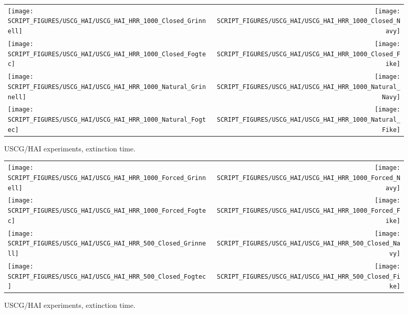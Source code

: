 


\newpage

\begin{figure}[p]
\begin{tabular*}{\textwidth}{l@{\extracolsep{\fill}}r}
\texttt{[image: SCRIPT\_FIGURES/USCG\_HAI/USCG\_HAI\_HRR\_1000\_Closed\_Grinnell]} &
\texttt{[image: SCRIPT\_FIGURES/USCG\_HAI/USCG\_HAI\_HRR\_1000\_Closed\_Navy]} \\
\texttt{[image: SCRIPT\_FIGURES/USCG\_HAI/USCG\_HAI\_HRR\_1000\_Closed\_Fogtec]} &
\texttt{[image: SCRIPT\_FIGURES/USCG\_HAI/USCG\_HAI\_HRR\_1000\_Closed\_Fike]} \\
\texttt{[image: SCRIPT\_FIGURES/USCG\_HAI/USCG\_HAI\_HRR\_1000\_Natural\_Grinnell]} &
\texttt{[image: SCRIPT\_FIGURES/USCG\_HAI/USCG\_HAI\_HRR\_1000\_Natural\_Navy]} \\
\texttt{[image: SCRIPT\_FIGURES/USCG\_HAI/USCG\_HAI\_HRR\_1000\_Natural\_Fogtec]} &
\texttt{[image: SCRIPT\_FIGURES/USCG\_HAI/USCG\_HAI\_HRR\_1000\_Natural\_Fike]}
\end{tabular*}
\caption[USCG/HAI experiments, extinction time]{USCG/HAI experiments, extinction time.}
\label{USCG_HAI_2}
\end{figure}

\begin{figure}[p]
\begin{tabular*}{\textwidth}{l@{\extracolsep{\fill}}r}
\texttt{[image: SCRIPT\_FIGURES/USCG\_HAI/USCG\_HAI\_HRR\_1000\_Forced\_Grinnell]} &
\texttt{[image: SCRIPT\_FIGURES/USCG\_HAI/USCG\_HAI\_HRR\_1000\_Forced\_Navy]} \\
\texttt{[image: SCRIPT\_FIGURES/USCG\_HAI/USCG\_HAI\_HRR\_1000\_Forced\_Fogtec]} &
\texttt{[image: SCRIPT\_FIGURES/USCG\_HAI/USCG\_HAI\_HRR\_1000\_Forced\_Fike]} \\
\texttt{[image: SCRIPT\_FIGURES/USCG\_HAI/USCG\_HAI\_HRR\_500\_Closed\_Grinnell]} &
\texttt{[image: SCRIPT\_FIGURES/USCG\_HAI/USCG\_HAI\_HRR\_500\_Closed\_Navy]} \\
\texttt{[image: SCRIPT\_FIGURES/USCG\_HAI/USCG\_HAI\_HRR\_500\_Closed\_Fogtec]} &
\texttt{[image: SCRIPT\_FIGURES/USCG\_HAI/USCG\_HAI\_HRR\_500\_Closed\_Fike]}
\end{tabular*}
\caption[USCG/HAI experiments, extinction time]{USCG/HAI experiments, extinction time.}
\label{USCG_HAI_4}
\end{figure}

